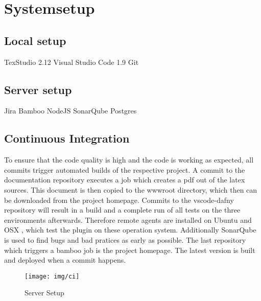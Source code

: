 \section{Systemsetup}
\subsection{Local setup}
TexStudio 2.12\newline
Visual Studio Code 1.9\newline
Git 


\subsection{Server setup}
Jira \newline
Bamboo\newline
NodeJS\newline
SonarQube\newline
Postgres


\subsection{Continuous Integration}

To ensure that the code quality is high and the code is working as expected, all commits trigger automated builds of the respective project. A commit to the documentation repository executes a job which creates a pdf out of the latex sources. This document is then copied to the wwwroot directory, which then can be downloaded from the project homepage. Commits to the vscode-dafny repository will result in a build and a complete run of all tests on the three environments afterwards. Therefore remote agents are installed on Ubuntu and OSX , which test the plugin on these operation system.  Additionally SonarQube is used to find bugs and bad pratices as early as possible. The last repository which triggers a bamboo job is the project homepage. The latest version is built and deployed when a commit happens. 


\begin{figure}[H]
	\centering
	\texttt{[image: img/ci]}
	\caption{Server Setup}
	\label{fig:Server setup}
\end{figure}